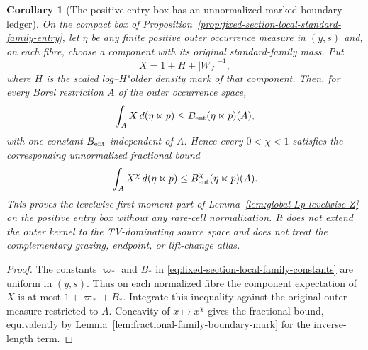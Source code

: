 \documentclass[11pt]{article}
\newtheorem{corollary}[theorem]{Corollary}
\begin{document}
\begin{corollary}[The positive entry box has an unnormalized marked
boundary ledger]
\label{cor:fixed-section-local-aggregate-Z}
On the compact box of
Proposition~\ref{prop:fixed-section-local-standard-family-entry}, let
$\eta$ be any finite positive outer occurrence measure in $(y,s)$ and, on
each fibre, choose a component with its original standard-family mass.  Put
\[
 X=1+H+|W_J|^{-1},
\]
where $H$ is the scaled log--H"older density mark of that component.  Then,
for every Borel restriction $A$ of the outer occurrence space,
\begin{equation}
\label{eq:fixed-section-local-aggregate-Z}
 \int_A X\,d(\eta\ltimes p)
 \le B_{\rm ent}(\eta\ltimes p)(A),
\end{equation}
with one constant $B_{\rm ent}$ independent of $A$.  Hence every
$0<\chi<1$ satisfies the corresponding unnormalized fractional bound
\[
 \int_A X^\chi\,d(\eta\ltimes p)
 \le B_{\rm ent}^\chi(\eta\ltimes p)(A).
\]
This proves the levelwise first-moment part of
Lemma~\ref{lem:global-Lp-levelwise-Z} on the positive entry box without any
rare-cell normalization.  It does not extend the outer kernel to the
TV-dominating source space and does not treat the complementary grazing,
endpoint, or lift-change atlas.
\end{corollary}

\begin{proof}
The constants $\varpi_*$ and $B_*$ in
\eqref{eq:fixed-section-local-family-constants} are uniform in $(y,s)$.
Thus on each normalized fibre the component expectation of $X$ is at most
$1+\varpi_*+B_*$.  Integrate this inequality against the original outer measure
restricted to $A$.  Concavity of $x\mapsto x^\chi$ gives the fractional
bound, equivalently by
Lemma~\ref{lem:fractional-family-boundary-mark} for the inverse-length term.
\end{proof}
\end{document}
